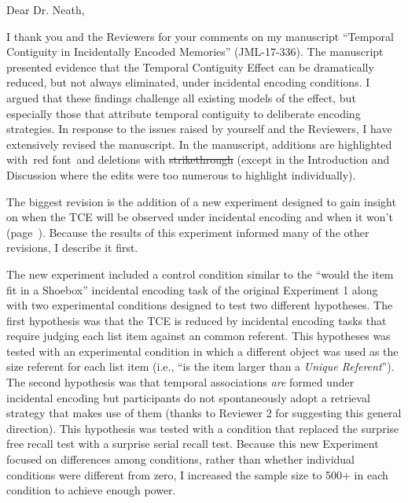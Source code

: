 \documentclass[12pt]{article}
\begin{document}
Dear Dr. Neath,
 

I thank you and the Reviewers for your comments on my manuscript ``Temporal Contiguity in Incidentally Encoded Memories'' (JML-17-336). The manuscript presented evidence that the Temporal Contiguity Effect can be dramatically reduced, but not always eliminated, under incidental encoding conditions. I argued that these findings challenge all existing models of the effect, but especially those that attribute temporal contiguity to deliberate encoding strategies. In response to the issues raised by yourself and the Reviewers, I have extensively revised the manuscript. In the manuscript, additions are highlighted with~\color{red}red font\color{black}~and deletions with \st{strikethrough} (except in the Introduction and Discussion where the edits were too numerous to highlight individually).

The biggest revision is the addition of a new experiment designed to gain insight on when the TCE will be observed under incidental encoding and when it won't (page~\pageref{newexp}). Because the results of this experiment informed many of the other revisions, I describe it first.

The new experiment included a control condition similar to the ``would the item fit in a Shoebox'' incidental encoding task of the original Experiment 1 along with two experimental conditions designed to test two different hypotheses. The first hypothesis was that the TCE is reduced by incidental encoding tasks that require judging each list item against an common referent. This hypotheses was tested with an experimental condition in which a different object was used as the size referent for each list item (i.e., ``is the item larger than a \emph{Unique Referent}''). The second hypothesis was that temporal associations \emph{are} formed under incidental encoding but participants do not spontaneously adopt a retrieval strategy that makes use of them (thanks to Reviewer 2 for suggesting this general direction). This hypothesis was tested with a condition that replaced the surprise free recall test with a surprise serial recall test. Because this new Experiment focused on differences among conditions, rather than whether individual conditions were different from zero, I increased the sample size to 500+ in each condition to achieve enough power.
\end{document}
